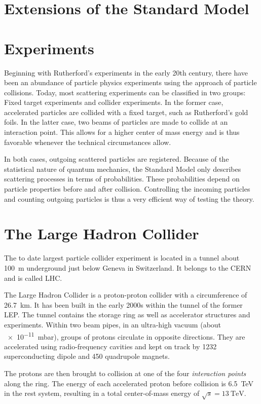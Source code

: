 
\section{Extensions of the Standard Model}


\section{Experiments}
Beginning with Rutherford's experiments in the early 20th century, there have been an abundance of particle physics experiments using the approach of particle collisions. Today, most scattering experiments can be classified in two groups: Fixed target experiments and collider experiments. In the former case, accelerated particles are collided with a fixed target, such as Rutherford's gold foils. In the latter case, two beams of particles are made to collide at an interaction point. This allows for a higher center of mass energy and is thus favorable whenever the technical circumstances allow.

In both cases, outgoing scattered particles are registered. 
Because of the statistical nature of quantum mechanics, the Standard Model only describes scattering processes in terms of probabilities. These probabilities depend on particle properties before and after collision. 
Controlling the incoming particles and counting outgoing particles is thus a very efficient way of testing the theory.

\section{The Large Hadron Collider}
The to date largest particle collider experiment is located in a tunnel about \SI{100}{\m} underground just below Geneva in Switzerland. It belongs to the \ac{CERN} and is called \ac{LHC}.

The Large Hadron Collider is a proton-proton collider with a circumference of \SI{26.7}{\km}. It has been built in the early 2000s within the tunnel of the former \ac{LEP}. The tunnel contains the storage ring as well as accelerator structures and experiments. Within two beam pipes, in an ultra-high vacuum (about \SI{e-11}{\milli\bar}), groups of protons circulate in opposite directions. They are accelerated using radio-frequency cavities and kept on track by \num{1232} superconducting dipole and \num{450} quadrupole magnets.

The protons are then brought to collision at one of the four \emph{interaction points} along the ring. The energy of each accelerated proton before collision is \SI{6.5}{\TeV} in the rest system, resulting in a total center-of-mass energy of $\sqrt{s} = \SI{13}{\TeV}$.

